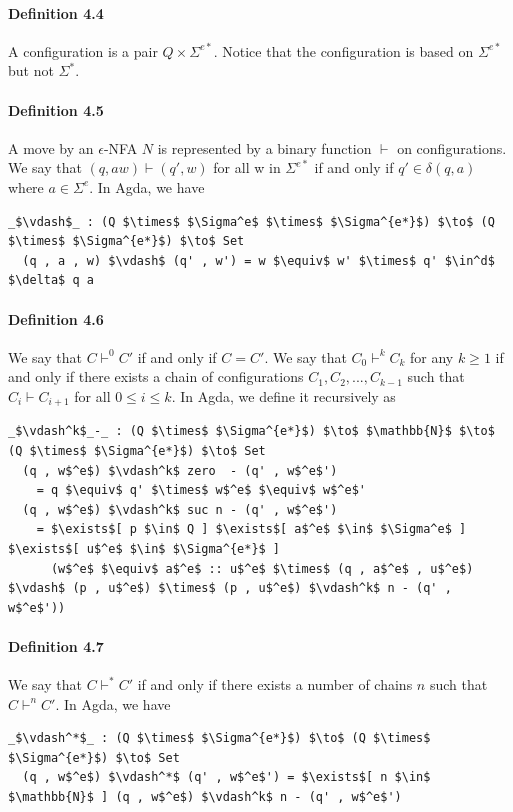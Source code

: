 \documentclass[twoside,openright,final]{bhamthesis}
\begin{document}
\paragraph{Definition 4.4} A configuration is a pair \(Q \times
\Sigma^{e*}\). Notice that the configuration is based on
\(\Sigma^{e*}\) but not \(\Sigma^*\).

\paragraph{Definition 4.5} A move by an \(\epsilon\)-NFA \(N\) is
represented by a binary function \(\vdash\) on configurations. We say
that \((q, aw) \vdash (q' , w)\) for all w in \(\Sigma^{e*}\)
if and only if \(q' \in \delta (q , a)\) where \(a \in \Sigma^e\). In
Agda, we have
\begin{lstlisting}[mathescape=true,aboveskip=0pt,belowskip=0pt]
  _$\vdash$_ : (Q $\times$ $\Sigma^e$ $\times$ $\Sigma^{e*}$) $\to$ (Q $\times$ $\Sigma^{e*}$) $\to$ Set
  (q , a , w) $\vdash$ (q' , w') = w $\equiv$ w' $\times$ q' $\in^d$ $\delta$ q a
\end{lstlisting}

\paragraph{Definition 4.6} We say that \(C \vdash^0 C'\) if and only
if \(C = C'\). We say that \(C_0 \vdash^k C_k\) for any \(k \geq 1\) if and only if there exists a chain of
configurations \(C_1, C_2, ..., C_{k-1}\) such that \(C_i \vdash
C_{i+1}\) for all \(0 \leq i \leq k\). In Agda, we define it
recursively as
\begin{lstlisting}[mathescape=true,aboveskip=0pt,belowskip=0pt]
  _$\vdash^k$_-_ : (Q $\times$ $\Sigma^{e*}$) $\to$ $\mathbb{N}$ $\to$ (Q $\times$ $\Sigma^{e*}$) $\to$ Set
  (q , w$^e$) $\vdash^k$ zero  - (q' , w$^e$')
    = q $\equiv$ q' $\times$ w$^e$ $\equiv$ w$^e$'
  (q , w$^e$) $\vdash^k$ suc n - (q' , w$^e$') 
    = $\exists$[ p $\in$ Q ] $\exists$[ a$^e$ $\in$ $\Sigma^e$ ] $\exists$[ u$^e$ $\in$ $\Sigma^{e*}$ ]
      (w$^e$ $\equiv$ a$^e$ :: u$^e$ $\times$ (q , a$^e$ , u$^e$) $\vdash$ (p , u$^e$) $\times$ (p , u$^e$) $\vdash^k$ n - (q' , w$^e$'))
\end{lstlisting}

\paragraph{Definition 4.7} We say that \(C \vdash^* C'\) if and only
if there exists a number of chains \(n\) such that \(C \vdash^n C'\). In Agda,
we have
\begin{lstlisting}[mathescape=true,aboveskip=0pt,belowskip=0pt]
  _$\vdash^*$_ : (Q $\times$ $\Sigma^{e*}$) $\to$ (Q $\times$ $\Sigma^{e*}$) $\to$ Set
  (q , w$^e$) $\vdash^*$ (q' , w$^e$') = $\exists$[ n $\in$ $\mathbb{N}$ ] (q , w$^e$) $\vdash^k$ n - (q' , w$^e$')
\end{lstlisting}
\end{document}
